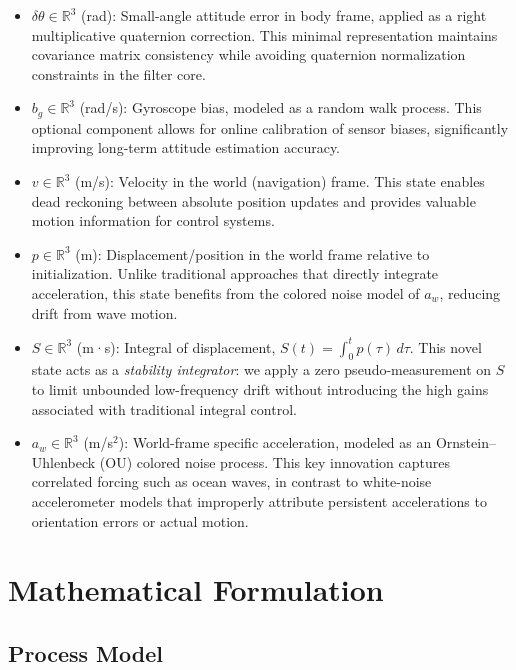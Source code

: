 \documentclass[11pt,letterpaper]{article}
\begin{document}
\begin{itemize}
  \item $\delta\theta\in\mathbb{R}^3$ (rad): Small-angle attitude error in body frame, applied as a right multiplicative quaternion correction. This minimal representation maintains covariance matrix consistency while avoiding quaternion normalization constraints in the filter core.
  
  \item $b_g\in\mathbb{R}^3$ (rad/s): Gyroscope bias, modeled as a random walk process. This optional component allows for online calibration of sensor biases, significantly improving long-term attitude estimation accuracy.
  
  \item $v\in\mathbb{R}^3$ (m/s): Velocity in the world (navigation) frame. This state enables dead reckoning between absolute position updates and provides valuable motion information for control systems.
  
  \item $p\in\mathbb{R}^3$ (m): Displacement/position in the world frame relative to initialization. Unlike traditional approaches that directly integrate acceleration, this state benefits from the colored noise model of $a_w$, reducing drift from wave motion.
  
  \item $S\in\mathbb{R}^3$ (m·s): Integral of displacement, $S(t)=\int_0^t p(\tau)\,d\tau$. This novel state acts as a \emph{stability integrator}: we apply a zero pseudo-measurement on $S$ to limit unbounded low-frequency drift without introducing the high gains associated with traditional integral control.
  
  \item $a_w\in\mathbb{R}^3$ (m/s$^2$): World-frame specific acceleration, modeled as an Ornstein--Uhlenbeck (OU) colored noise process. This key innovation captures correlated forcing such as ocean waves, in contrast to white-noise accelerometer models that improperly attribute persistent accelerations to orientation errors or actual motion.
\end{itemize}

\section{Mathematical Formulation}
\label{sec:formulation}

\subsection{Process Model}
\end{document}
